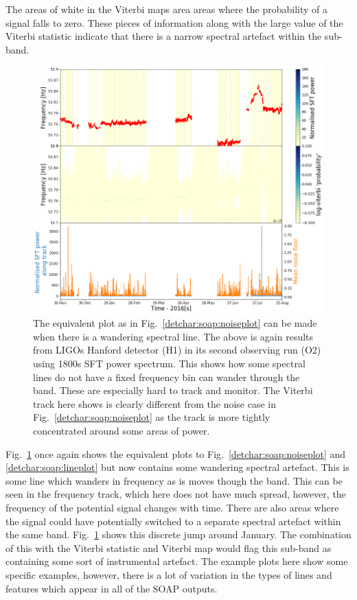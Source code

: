 The areas of white in the Viterbi maps area areas where the probability of a signal falls to zero. 
These pieces of information along with the large value of the Viterbi statistic indicate that there is a narrow spectral artefact within the sub-band. 
%
\begin{figure}
	\centering
	\includegraphics[width=\textwidth]{C5_detchar/track_F53_7_53_9_wander.png}
	\caption{The equivalent plot as in Fig.~\ref{detchar:soap:noiseplot} can be made when there is a wandering spectral line. The above is again results from \acp{LIGO} Hanford detector (H1) in its second observing run (O2) using 1800s \ac{SFT} power spectrum. This shows how some spectral lines do not have a fixed frequency bin can wander through the band. These are especially hard to track and monitor. The Viterbi track here shows is clearly different from the noise case in Fig.~\ref{detchar:soap:noiseplot} as the track is more tightly concentrated around some areas of power. }
	\label{detchar:soap:wanderplot}
\end{figure}
%
Fig.~\ref{detchar:soap:wanderplot} once again shows the equivalent plots to Fig.~\ref{detchar:soap:noiseplot} and \ref{detchar:soap:lineplot} but now contains some wandering spectral artefact. 
This is some line which wanders in frequency as is moves though the band. 
This can be seen in the frequency track, which here does not have much spread, however, the frequency of the potential signal changes with time. 
There are also areas where the signal could have potentially switched to a separate spectral artefact within the same band. Fig.~\ref{detchar:soap:wanderplot} shows this discrete jump around January. 
The combination of this with the Viterbi statistic and Viterbi map would flag this sub-band as containing some sort of instrumental artefact. 
The example plots here show some specific examples, however, there is a lot of variation in the types of lines and features which appear in all of the SOAP outputs. 

